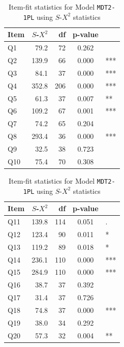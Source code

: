 \documentclass[a4paper]{report}
\begin{document}
\begin{table}[H]
  \begin{minipage}{0.5\linewidth}
    \centering
    \begin{tabular}{lrrcl}
      \hline
    Item & $S$-$X^2$ & df & p-value & \\ 
      \hline
    Q1 & 79.2 & 72 & 0.262 &  \\ 
      Q2 & 139.9 & 66 & 0.000 & *** \\ 
      Q3 & 84.1 & 37 & 0.000 & *** \\ 
      Q4 & 352.8 & 206 & 0.000 & *** \\ 
      Q5 & 61.3 & 37 & 0.007 & ** \\ 
      Q6 & 109.2 & 67 & 0.001 & *** \\ 
      Q7 & 74.2 & 65 & 0.204 &  \\ 
      Q8 & 293.4 & 36 & 0.000 & *** \\ 
      Q9 & 32.5 & 38 & 0.723 &  \\ 
      Q10 & 75.4 & 70 & 0.308 &  \\ 
       \hline
    \end{tabular}
  \end{minipage}%
  \begin{minipage}{0.5\linewidth}
    \centering
    \begin{tabular}{lrrcl}
      \hline
    Item & $S$-$X^2$ & df & p-value & \\ 
      \hline
    Q11 & 139.8 & 114 & 0.051 & . \\ 
      Q12 & 123.4 & 90 & 0.011 & * \\ 
      Q13 & 119.2 & 89 & 0.018 & * \\ 
      Q14 & 236.1 & 110 & 0.000 & *** \\ 
      Q15 & 284.9 & 110 & 0.000 & *** \\ 
      Q16 & 38.7 & 37 & 0.392 &  \\ 
      Q17 & 31.4 & 37 & 0.726 &  \\ 
      Q18 & 74.8 & 37 & 0.000 & *** \\ 
      Q19 & 38.0 & 34 & 0.292 &  \\ 
      Q20 & 57.3 & 32 & 0.004 & ** \\ 
       \hline
    \end{tabular}
  \end{minipage}
  \caption{\label{tab:IRT_pre17_1PL_itemfit}Item-fit statistics for Model \texttt{MDT2-1PL} using $S\text{-}X^2$ statistics}
\end{table}
\end{document}
